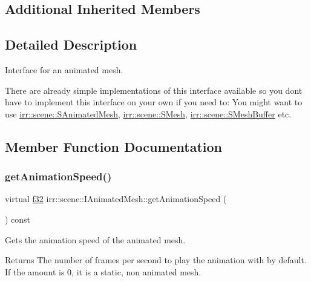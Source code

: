 \subsection*{Additional Inherited Members}


\subsection{Detailed Description}
Interface for an animated mesh. 

There are already simple implementations of this interface available so you don\textquotesingle{}t have to implement this interface on your own if you need to\+: You might want to use \hyperlink{structirr_1_1scene_1_1SAnimatedMesh}{irr\+::scene\+::\+S\+Animated\+Mesh}, \hyperlink{structirr_1_1scene_1_1SMesh}{irr\+::scene\+::\+S\+Mesh}, \hyperlink{namespaceirr_1_1scene_ae74662460587fcb33d99e340bda3e826}{irr\+::scene\+::\+S\+Mesh\+Buffer} etc. 

\subsection{Member Function Documentation}
\mbox{\label{classirr_1_1scene_1_1IAnimatedMesh_acb4249295319c8240d5bedc167417435}} 
\subsubsection{\texorpdfstring{get\+Animation\+Speed()}{getAnimationSpeed()}\hspace{0.1cm}{\footnotesize\ttfamily [1/2]}}
{\footnotesize\ttfamily virtual \hyperlink{namespaceirr_a0277be98d67dc26ff93b1a6a1d086b07}{f32} irr\+::scene\+::\+I\+Animated\+Mesh\+::get\+Animation\+Speed (\begin{DoxyParamCaption}{ }\end{DoxyParamCaption}) const\hspace{0.3cm}{\ttfamily [pure virtual]}}



Gets the animation speed of the animated mesh. 

\begin{DoxyReturn}{Returns}
The number of frames per second to play the animation with by default. If the amount is 0, it is a static, non animated mesh. 
\end{DoxyReturn}



